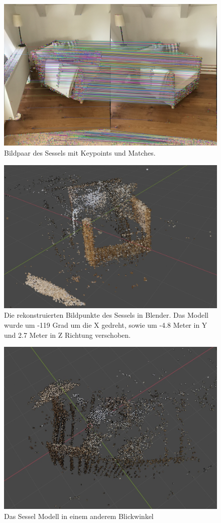 \begin{figure}
    \includegraphics[width=\textwidth]{src/img/chair_first_pair_with_matches.jpg}
    \caption{Bildpaar des Sessels mit Keypoints und Matches.}
    \label{fig:chair-first-pair-with-matches}
\end{figure}

\begin{figure}
    \includegraphics[width=\textwidth]{src/img/chair_model.jpg}
    \caption{Die rekonstruierten Bildpunkte des Sessels in Blender. Das Modell wurde um -119 Grad um die X gedreht, sowie um -4.8 Meter in Y und 2.7 Meter in Z Richtung verschoben.}
    \label{fig:chair-model}
\end{figure}

\begin{figure}
    \includegraphics[width=\textwidth]{src/img/chair_model_2.jpg}
    \caption{Das Sessel Modell in einem anderem Blickwinkel}
    \label{fig:chair-model-2}
\end{figure}

